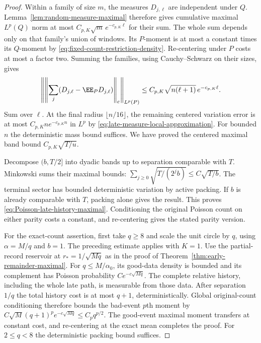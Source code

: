 \documentclass[11pt,letterpaper]{article}
\begin{document}
\begin{proof}
Within a family of size $m$, the measures $D_{j,\ell}$ are
independent under $Q$. Lemma~\ref{lem:random-measure-maximal}
therefore gives cumulative maximal $L^p(Q)$ norm at most
$C_{p,K}\sqrt m\,e^{-c_{p,K}\ell}$ for their sum.
The whole sum depends only on that family's union of windows.
Its $P$-moment is at most a constant times its $Q$-moment
by \eqref{eq:fixed-count-restriction-density}.
Re-centering under $P$ costs at most a factor two.
Summing the families, using Cauchy--Schwarz on their sizes,
gives
\[
 \left\|\left\|\sum_j(D_{j,\ell}-\EE_PD_{j,\ell})
                                     \right\|_{\rm c}\right\|_{L^p(P)}
       \le C_{p,K}\sqrt{n(\ell+1)}\,e^{-c_{p,K}\ell}.
\]
Sum over $\ell$.
At the final radius $\lfloor n/16\rfloor$, the remaining
centered variation error is at most $C_{p,K}ne^{-c_{p,K}n}$
in $L^p$ by \eqref{eq:late-measure-local-approximation}.
For bounded $n$ the deterministic mass bound suffices.
We have proved the centered maximal band bound
$C_{p,K}\sqrt{T/u}$.

Decompose $(b,T/2]$ into dyadic bands up to separation
comparable with $T$. Minkowski sums their maximal bounds:
$\sum_{j\ge0}\sqrt{T/(2^jb)}\le C\sqrt{T/b}$.
The terminal sector has bounded deterministic variation by
active packing. If $b$ is already comparable with $T$,
packing alone gives the result.
This proves \eqref{eq:Poisson-late-history-maximal}.
Conditioning the original Poisson count on either parity
costs a constant, and re-centering gives the stated parity version.

For the exact-count assertion, first take $q\ge8$ and scale
the unit circle by $q$, using $\alpha=M/q$ and $b=1$.
The preceding estimate applies with $K=1$.
Use the partial-record reservoir at $r_*=1/\sqrt{Mq}$
as in the proof of Theorem~\ref{thm:early-remainder-maximal}.
For $q\le M/\alpha_0$, its good-data density is bounded and
its complement has Poisson probability $Ce^{-c\sqrt{Mq}}$.
The complete relative history, including the whole late path,
is measurable from those data.
After separation $1/q$ the total history cost is at most
$q+1$, deterministically. Global original-count conditioning
therefore bounds the bad-event $p$th moment by
$C\sqrt M(q+1)^p e^{-c\sqrt{Mq}}\le C_pq^{p/2}$.
The good-event maximal moment transfers at constant cost,
and re-centering at the exact mean completes the proof.
For $2\le q<8$ the deterministic packing bound suffices.
\end{proof}
\end{document}

